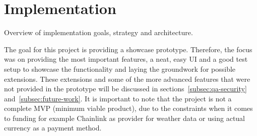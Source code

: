\documentclass[11pt,a4paper]{article}
\begin{document}
		\section{Implementation}\label{sec:implementation}
		Overview of implementation goals, strategy and architecture.

		The goal for this project is providing a showcase prototype.
		Therefore, the focus was on providing the most important features, a neat, easy UI and a good test setup to showcase the functionality and laying the groundwork for possible extensions.
		These extensions and some of the more advanced features that were not provided in the prototype will be discussed in sections~\ref{subsec:qa-security} and~\ref{subsec:future-work}.
		It is important to note that the project is not a complete MVP (minimum viable product), due to the constraints when it comes to funding for example Chainlink as provider for weather data or using actual currency as a payment method.

\end{document}
